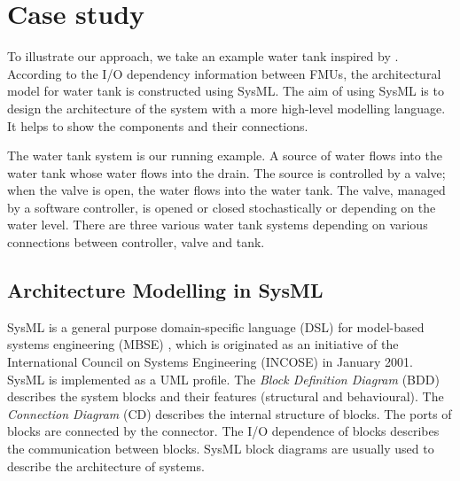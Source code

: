 
\section{Case study}
\label{sec:sysml}
To illustrate our approach, we take an example water tank inspired by \cite{AmalioPCW16}. According to the I/O dependency information between FMUs, the architectural model for water tank is constructed using SysML. The aim of using SysML is to design the architecture of the system with a more high-level modelling language. It helps to show the components and their connections.

The water tank system is our running example. A source of water flows into the water tank whose water flows into the drain. The source is controlled by a valve; when the valve is open, the water flows into the water tank. The valve, managed by a software controller, is opened or closed stochastically or depending on the water level. There are three various water tank systems depending on various connections between controller, valve and tank. 

\subsection{Architecture Modelling in SysML}
SysML is a general purpose domain-specific language (DSL) \cite{SemerathBHSV17} for model-based systems engineering (MBSE) \cite{Dori16}, which is originated as an initiative of the International Council on Systems Engineering (INCOSE) \cite{Pepper2015International} in January 2001. SysML is implemented as a UML profile. The \textit{Block Definition Diagram} (BDD) describes the system blocks and their features (structural and behavioural). The \textit{Connection Diagram} (CD) describes the internal structure of blocks. The ports of blocks are connected by the connector. The I/O dependence of blocks describes the communication between blocks. SysML block diagrams are usually used to describe the architecture of systems.

